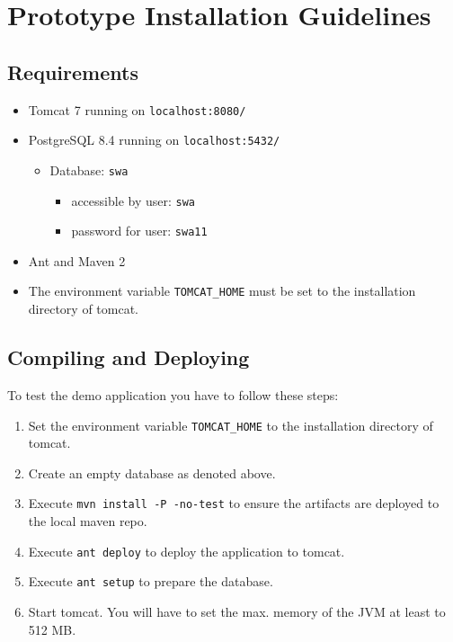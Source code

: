 \documentclass[11pt]{article}
\begin{document}
\newpage

\section{Prototype Installation Guidelines}

\subsection{Requirements}

\begin{itemize}
\item Tomcat 7 running on \texttt{localhost:8080/}
\item PostgreSQL 8.4 running on \texttt{localhost:5432/}
	\begin{itemize}
	\item Database: \texttt{swa}
		\begin{itemize}
		\item accessible by user: \texttt{swa}
		\item password for user: \texttt{swa11}
		\end{itemize}
	\end{itemize}
\item Ant and Maven 2
\item The environment variable \texttt{TOMCAT\_HOME} must be set to the installation directory of tomcat.
\end{itemize}

\subsection{Compiling and Deploying}

To test the demo application you have to follow these steps:

\begin{enumerate}
\item Set the environment variable \texttt{TOMCAT\_HOME} to the installation directory of tomcat.
\item Create an empty database as denoted above.
\item Execute \texttt{mvn install -P -no-test} to ensure the artifacts are deployed to the local maven repo.
\item Execute \texttt{ant deploy} to deploy the application to tomcat.
\item Execute \texttt{ant setup} to prepare the database.
\item Start tomcat. You will have to set the max. memory of the JVM at least to 512 MB.
\end{enumerate}
\end{document}
